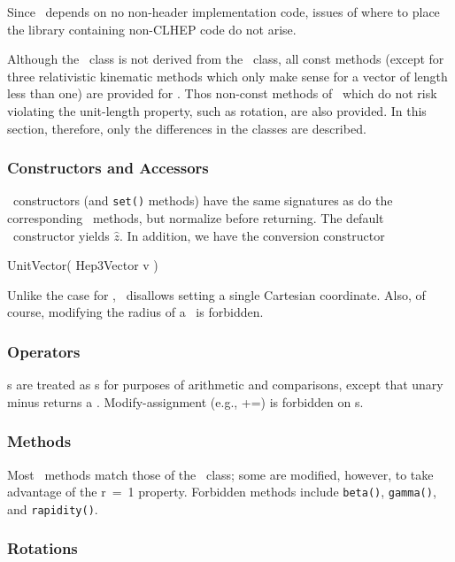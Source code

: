 Since \UV\ depends on no non-header implementation code, issues of where
to place the library containing non-CLHEP code do not arise.

Although the \UV\ class is not derived from the \SVz\ class,
all const methods (except for three relativistic kinematic methods
which only make sense for a vector of length less than one) 
are provided for \UV .
Thos non-const methods of \SV\ which do not risk violating the unit-length 
property, such as rotation, are also provided.  
In this section, therefore,
only the differences in the classes are described.

\subsubsection{Constructors and Accessors}

\UV\ constructors (and \verb|set()| methods)
have the same signatures as do the corresponding \SVz\ methods,
but normalize before returning.
The default \UV\ constructor yields $\hat{z}$.
In addition, we have the conversion constructor
\begin{shortlist}
  \item UnitVector( Hep3Vector v )
\end{shortlist}

\noindent
Unlike the case for \SV , \UV\ disallows setting a
single Cartesian coordinate.  Also, of course,
modifying the radius of a \UV\ is forbidden.

\subsubsection{Operators}

\UV s are treated as \SV s for purposes of arithmetic and comparisons,
except that unary minus returns a \UV .
Modify-assignment (e.g., +=) is forbidden on \UV s.

\subsubsection{Methods}
\label{unitMethods}

Most \UV\ methods match those of the \SV\ class; some are modified,
however, to take advantage of the r~=~1 property.
Forbidden methods include
\verb|beta()|, \verb|gamma()|, and \verb|rapidity()|.

\subsubsection{Rotations}

